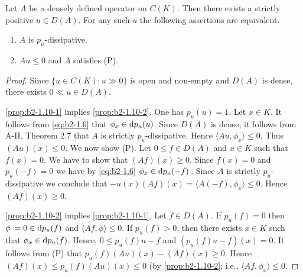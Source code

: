 \begin{proposition}\label{prop:b2-1.10}
%
Let $A$ be a densely defined operator on $C(K)$.
Then there exists a strictly positive $u \in D(A)$.
For any such $u$ the following assertions are equivalent.
\begin{enumerate}[\upshape (a)]
\item  \label{prop:b2-1.10-1}
$A$ is $p_{u}$-dissipative.

\item  \label{prop:b2-1.10-2}
$Au \leq 0$ and $A$ satisfies (P).
\end{enumerate}
\end{proposition}

\begin{proof}
Since $\{u \in C(K) \colon u \gg 0\}$ is open and non-empty and $D(A)$ is dense, there exists $0 \ll u \in D(A)$.

\ref{prop:b2-1.10-1} implies  \ref{prop:b2-1.10-2}.
One has $p_{u}(u) = 1$.
Let $x \in K$.
It follows from \eqref{eq:b2-1.6} that $\phi_{x} \in \mathop{}\!\mathrm{d}{p}_{u}(u)$.
Since $D(A)$ is dense, it follows from A-II, Theorem 2.7
that $A$ is strictly $p_{u}$-dissipative.
Hence $\langle Au,\phi_{x} \rangle \leq 0$.
Thus $(Au)(x) \leq 0$.
We now show (P).
Let $0 \leq f \in D(A)$ and $x \in K$ such that $f(x) = 0$.
We have to show that $(Af)(x) \geq 0$.
Since $f(x) = 0$ and $p_{u}(-f) = 0$ we have by \eqref{eq:b2-1.6}  $\phi_{x} \in \mathop{}\!\mathrm{d}{p}_{u}(-f)$\,.
Since $A$ is strictly $p_{u}$-dissipative we conclude that $-u(x)(Af)(x) = \langle A(-f),\phi_{x} \rangle \leq 0$.
Hence $(Af)(x) \geq 0$.

\ref{prop:b2-1.10-2} implies \ref{prop:b2-1.10-1}.
Let $f \in D(A)$.
If $p_{u}(f) = 0$ then $\phi \coloneqq 0 \in \mathop{}\!\mathrm{d}{p}_{u}(f)$ and $\langle Af,\phi \rangle \leq 0$.
If $p_{u}(f) > 0$, then there exists $x \in K$ such that $\phi_{x} \in \mathop{}\!\mathrm{d}{p}_{u}(f)$.
Hence, $0 \leq p_{u}(f)u - f$ and $(p_{u}(f)u - f)(x) = 0$.
It follows from (P) that $p_{u}(f)(Au)(x) - (Af)(x) \geq 0$.
Hence $(Af)(x) \leq p_{u}(f)(Au)(x) \leq 0$ (by \ref{prop:b2-1.10-2}; i.e., $\langle Af,\phi_{x} \rangle \leq 0$.
\end{proof}

